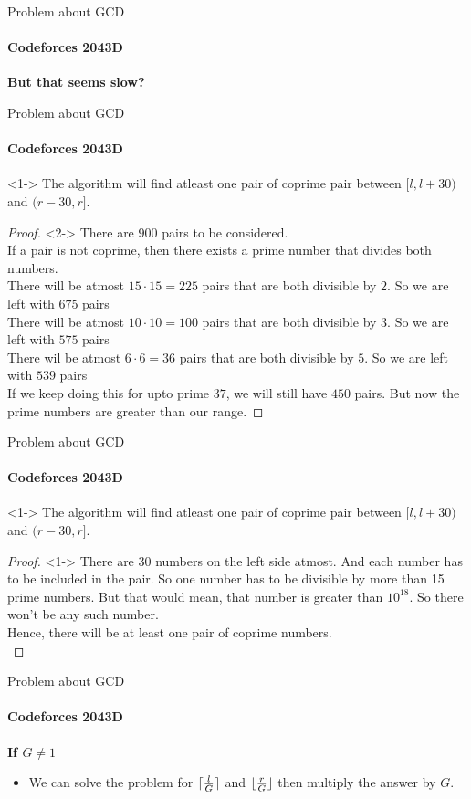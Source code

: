 \begin{frame}{Problem about GCD}
	\framesubtitle{Codeforces 2043D}
	\begin{center}
		\textbf{But that seems slow?} \\
	\end{center}
\end{frame}


\begin{frame}{Problem about GCD}
	\framesubtitle{Codeforces 2043D}
	\begin{theorem}<1->
		The algorithm will find atleast one pair of coprime pair between $[l, l + 30)$ and $(r - 30, r]$.
	\end{theorem}

	\begin{proof}<2->
        There are 900 pairs to be considered. \\ \pause
        If a pair is not coprime, then there exists a prime number that divides both numbers. \\\pause
        There will be atmost $15 \cdot 15 = 225$ pairs that are both divisible by $2$. So we are left with $675$ pairs\\ \pause
        There will be atmost $10 \cdot 10 = 100$ pairs that are both divisible by $3$. So we are left with $575$ pairs \\ \pause
        There wil be atmost $6 \cdot 6 = 36$ pairs that are both divisible by $5$. So we are left with $539$ pairs \\ \pause
        If we keep doing this for upto prime $37$, we will still have $450$ pairs. But now the prime numbers are greater than our range. 
    \end{proof}
\end{frame}

\begin{frame}{Problem about GCD}
	\framesubtitle{Codeforces 2043D}
	\begin{theorem}<1->
		The algorithm will find atleast one pair of coprime pair between $[l, l + 30)$ and $(r - 30, r]$.
	\end{theorem}

	\begin{proof}<1->
        There are 30 numbers on the left side atmost. And each number has to be included in the pair. So one number has to be divisible by more than 15 prime numbers.  \pause
        But that would mean, that number is greater than $10^{18}$. So there won't be any such number. \\ \pause 
        Hence, there will be at least one pair of coprime numbers. \\
    \end{proof}
\end{frame}

\begin{frame}{Problem about GCD}
	\framesubtitle{Codeforces 2043D}
	\textbf{If $G \neq 1$} \\
	\begin{itemize}
        \item <1-> We can solve the problem for $\ceil{\frac{l}{G}}$ and $\floor{\frac{r}{G}}$ then multiply the answer by $G$.
	\end{itemize}
\end{frame}
